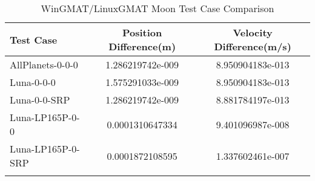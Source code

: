 \begin{table}[htbp!]
\centering
\caption{ WinGMAT/LinuxGMAT Moon Test Case Comparison}
      \begin{tabular}{lcc}
      \hline\hline
          Test Case & Position Difference(m) & Velocity Difference(m/s) \\
         \hline
         AllPlanets-0-0-0 & 1.286219742e-009 & 8.950904183e-013 \\
         Luna-0-0-0 & 1.575291033e-009 & 8.950904183e-013 \\
         Luna-0-0-SRP & 1.286219742e-009 & 8.881784197e-013 \\
         Luna-LP165P-0-0 & 0.0001310647334 & 9.401096987e-008 \\
         Luna-LP165P-0-SRP & 0.0001872108595 & 1.337602461e-007 \\
      \hline\hline
      \label{Table: Moon WinGMAT-LinuxGMAT Table} 
\end{tabular}
\end{table}
